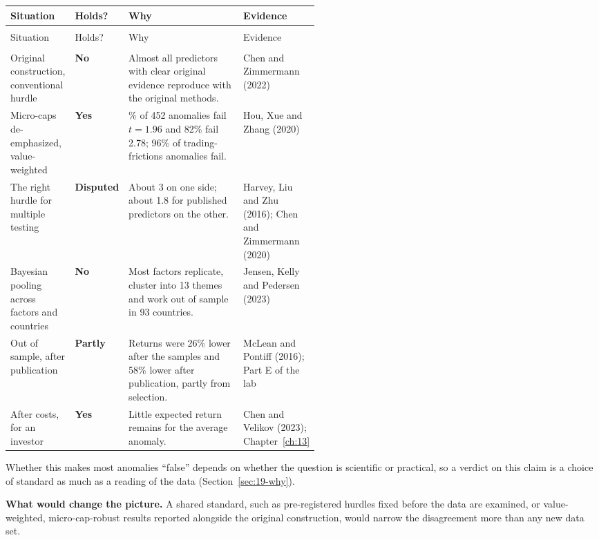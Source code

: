 {\small
\begin{longtable}{@{}>{\raggedright\arraybackslash}p{0.19\linewidth}>{\raggedright\arraybackslash}p{0.10\linewidth}>{\raggedright\arraybackslash}p{}>{\raggedright\arraybackslash}p{0.23\linewidth}@{}}
\toprule
Situation & Holds? & Why & Evidence \\
\midrule
\endfirsthead
\multicolumn{4}{@{}l}{\emph{(continued)}} \\
\toprule
Situation & Holds? & Why & Evidence \\
\midrule
\endhead
\midrule
\multicolumn{4}{r@{}}{\emph{(continued on the next page)}} \\
\endfoot
\bottomrule
\endlastfoot
Original construction, conventional hurdle & \textbf{No} & Almost all predictors with clear original evidence reproduce with the original methods. & Chen and Zimmermann (2022) \\
\addlinespace[3pt]
Micro-caps de-emphasized, value-weighted & \textbf{Yes} & 65\% of 452 anomalies fail $t = 1.96$ and 82\% fail 2.78; 96\% of trading-frictions anomalies fail. & Hou, Xue and Zhang (2020) \\
\addlinespace[3pt]
The right hurdle for multiple testing & \textbf{Disputed} & About 3 on one side; about 1.8 for published predictors on the other. & Harvey, Liu and Zhu (2016); Chen and Zimmermann (2020) \\
\addlinespace[3pt]
Bayesian pooling across factors and countries & \textbf{No} & Most factors replicate, cluster into 13 themes and work out of sample in 93 countries. & Jensen, Kelly and Pedersen (2023) \\
\addlinespace[3pt]
Out of sample, after publication & \textbf{Partly} & Returns were 26\% lower after the samples and 58\% lower after publication, partly from selection. & McLean and Pontiff (2016); Part E of the lab \\
\addlinespace[3pt]
After costs, for an investor & \textbf{Yes} & Little expected return remains for the average anomaly. & Chen and Velikov (2023); Chapter~\ref{ch:13} \\
\end{longtable}
}

Whether this makes most anomalies ``false'' depends on whether the question is scientific or practical, so a verdict on this claim is a choice of standard as much as a reading of the data (Section~\ref{sec:19-why}).

\textbf{What would change the picture.} A shared standard, such as pre-registered hurdles fixed before the data are examined, or value-weighted, micro-cap-robust results reported alongside the original construction, would narrow the disagreement more than any new data set.

